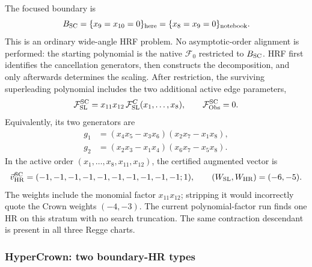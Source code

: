 \documentclass[a4paper,11pt]{article}
\newcommand{\WSL}{W_{\rm SL}}
\newcommand{\WHR}{W_{\rm HR}}
\newcommand{\vHR}{\vec v_{\rm HR}}
\begin{document}
The focused boundary is
\begin{equation}
 B_{\rm SC}=\{x_9=x_{10}=0\}_{\rm here}
 =\{x_8=x_9=0\}_{\rm notebook}.
 \label{eq:SC-boundary}
\end{equation}
This is an ordinary wide-angle HRF problem.  No asymptotic-order alignment is
performed: the starting polynomial is the native \(\mathcal F_0\) restricted
to \(B_{\rm SC}\).  HRF first identifies the cancellation generators, then
constructs the decomposition, and only afterwards determines the scaling.
After restriction, the surviving superleading polynomial includes the two
additional active edge parameters,
\begin{equation}
 \mathcal F_{\rm SL}^{\rm SC}
 =x_{11}x_{12}\,\mathcal F_{\rm SL}^{C}(x_1,\ldots,x_8),
 \qquad \mathcal F_{\rm Obs}^{\rm SC}=0.
 \label{eq:SC-decomposition}
\end{equation}
Equivalently, its two generators are
\begin{align}
 g_1&=(x_4x_5-x_3x_6)(x_2x_7-x_1x_8),\\
 g_2&=(x_2x_3-x_1x_4)(x_6x_7-x_5x_8).
 \label{eq:SC-generators}
\end{align}
In the active order \((x_1,\ldots,x_8,x_{11},x_{12})\), the certified
augmented vector is
\begin{equation}
 \vHR^{\rm SC}=(-1,-1,-1,-1,-1,-1,-1,-1,-1,-1;1),
 \qquad (\WSL,\WHR)=(-6,-5).
 \label{eq:SC-vector}
\end{equation}
The weights include the monomial factor \(x_{11}x_{12}\); stripping it would
incorrectly quote the Crown weights \((-4,-3)\).  The current
polynomial-factor run finds one HR on this stratum with no search truncation.
The same contraction descendant is present in all three Regge charts.

\subsubsection*{HyperCrown: two boundary-HR types}
\end{document}
